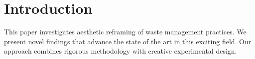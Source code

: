\section{Introduction}

This paper investigates aesthetic reframing of waste management practices. We present novel findings that advance the state of the art in this exciting field. Our approach combines rigorous methodology with creative experimental design.
